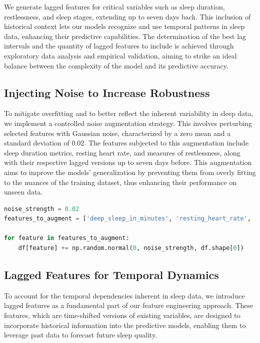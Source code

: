 \documentclass[10pt]{extarticle}
\begin{document}
We generate lagged features for critical variables such as sleep duration, restlessness, and sleep stages, extending up to seven days back. This inclusion of historical context lets our models recognize and use temporal patterns in sleep data, enhancing their predictive capabilities. The determination of the best lag intervals and the quantity of lagged features to include is achieved through exploratory data analysis and empirical validation, aiming to strike an ideal balance between the complexity of the model and its predictive accuracy.

\subsection{Injecting Noise to Increase Robustness}

To mitigate overfitting and to better reflect the inherent variability in sleep data, we implement a controlled noise augmentation strategy. This involves perturbing selected features with Gaussian noise, characterized by a zero mean and a standard deviation of 0.02. The features subjected to this augmentation include sleep duration metrics, resting heart rate, and measures of restlessness, along with their respective lagged versions up to seven days before. This augmentation aims to improve the models' generalization by preventing them from overly fitting to the nuances of the training dataset, thus enhancing their performance on unseen data.

\begin{lstlisting}[language=Python]
noise_strength = 0.02
features_to_augment = ['deep_sleep_in_minutes', 'resting_heart_rate', 'restlessness'] + [f'deep_sleep_in_minutes_lag{lag}' for lag in range(1, 8)] + [f'restlessness_lag{lag}' for lag in range(1, 8)]

for feature in features_to_augment:
    df[feature] += np.random.normal(0, noise_strength, df.shape[0])
\end{lstlisting}

\subsection{Lagged Features for Temporal Dynamics}

To account for the temporal dependencies inherent in sleep data, we introduce lagged features as a fundamental part of our feature engineering approach. These features, which are time-shifted versions of existing variables, are designed to incorporate historical information into the predictive models, enabling them to leverage past data to forecast future sleep quality.
\end{document}
